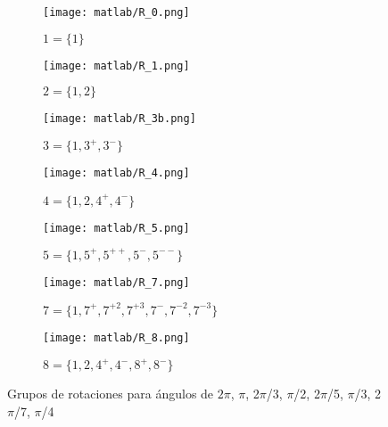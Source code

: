 \documentclass{report}
\begin{document}
\begin{figure}[h!]
    \centering
    \begin{subfigure}{0.24\textwidth}
        \texttt{[image: matlab/R\_0.png]}
        \caption{$1= \lbrace 1\rbrace$}
    \end{subfigure}
    \begin{subfigure}{0.24\textwidth}
        \texttt{[image: matlab/R\_1.png]}
        \caption{$ 2= \lbrace 1,2\rbrace$}
    \end{subfigure}
    \begin{subfigure}{0.24\textwidth}
        \texttt{[image: matlab/R\_3b.png]}
        \caption{$ 3= \lbrace 1, 3^+, 3^- \rbrace$}
    \end{subfigure}
    \begin{subfigure}{0.24\textwidth}
        \texttt{[image: matlab/R\_4.png]}
        \caption{$ 4= \lbrace 1, 2, 4^+, 4^- \rbrace$}
    \end{subfigure}

    \begin{subfigure}{0.24\textwidth}
        \texttt{[image: matlab/R\_5.png]}
        \caption{}$ 5= \lbrace 1, 5^+, 5^{++}, 5^-, 5^{--} \rbrace$
    \end{subfigure}
    \begin{subfigure}{0.24\textwidth}
    \end{subfigure}
    \begin{subfigure}{0.24\textwidth}
        \texttt{[image: matlab/R\_7.png]}
        \caption{}
        \tiny{  $ 7=\lbrace 1, 7^+, 7^{+2}, 7^{+3}, 7^-, 7^{-2}, 7^{-3} \rbrace $}
    \end{subfigure}
    \begin{subfigure}{0.24\textwidth}
        \texttt{[image: matlab/R\_8.png]}
        \caption{}$8=\lbrace 1, 2, 4^+, 4^-, 8^+, 8^- \rbrace$
    \end{subfigure}

    \caption{Grupos de rotaciones para ángulos de $2\pi$, $\pi$, 2$\pi$/3, $\pi$/2, 2$\pi$/5, $\pi$/3, 2$\pi$/7, $\pi$/4 }
\end{figure}
\end{document}
